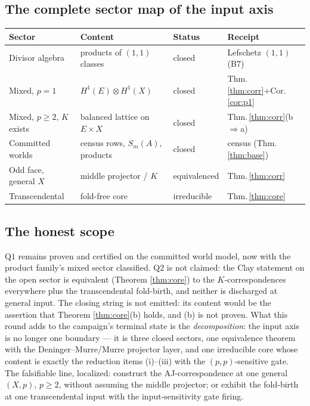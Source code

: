 \documentclass[11pt]{article}
\begin{document}
\subsection*{The complete sector map of the input axis}

\begin{center}
\begin{tabular}{@{}llll@{}}
\toprule
Sector & Content & Status & Receipt \\
\midrule
Divisor algebra & products of $(1,1)$ classes & closed & Lefschetz $(1,1)$ (B7) \\
Mixed, $p=1$ & $H^1(E)\otimes H^1(X)$ & closed & Thm.\,\ref{thm:corr}+Cor.\,\ref{cor:p1} \\
Mixed, $p\ge2$, $K$ exists & balanced lattice on $E\times X$ & closed & Thm.\,\ref{thm:corr}(b$\Rightarrow$a) \\
Committed worlds & census rows, $S_m(A)$, products & closed & census (Thm.\,\ref{thm:base}) \\
Odd face, general $X$ & middle projector / $K$ & equivalenced & Thm.\,\ref{thm:corr} \\
Transcendental & fold-free core & irreducible & Thm.\,\ref{thm:core} \\
\bottomrule
\end{tabular}
\end{center}

\subsection*{The honest scope}

$\mathrm{Q1}$ remains proven and certified on the committed world model, now
with the product family's mixed sector classified. $\mathrm{Q2}$ is not
claimed: the Clay statement on the open sector is equivalent (Theorem
\ref{thm:core}) to the $K$-correspondences everywhere plus the transcendental
fold-birth, and neither is discharged at general input. The closing string is
not emitted: its content would be the assertion that Theorem
\ref{thm:core}(b) holds, and (b) is not proven. What this round adds to the
campaign's terminal state is the \emph{decomposition}: the input axis is no
longer one boundary --- it is three closed sectors, one equivalence theorem
with the Deninger--Murre/Murre projector layer, and one irreducible core whose
content is exactly the reduction items (i)--(iii) with the $(p,p)$-sensitive
gate. The falsifiable line, localized: construct the AJ-correspondence at one
general $(X,p)$, $p\ge2$, without assuming the middle projector; or exhibit
the fold-birth at one transcendental input with the input-sensitivity gate
firing.
\end{document}

